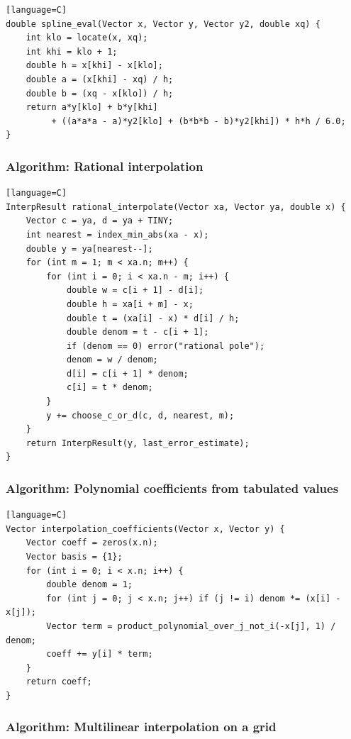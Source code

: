 \documentclass[11pt]{article}
\begin{document}
\begin{verbatim}[language=C]
double spline_eval(Vector x, Vector y, Vector y2, double xq) {
    int klo = locate(x, xq);
    int khi = klo + 1;
    double h = x[khi] - x[klo];
    double a = (x[khi] - xq) / h;
    double b = (xq - x[klo]) / h;
    return a*y[klo] + b*y[khi]
         + ((a*a*a - a)*y2[klo] + (b*b*b - b)*y2[khi]) * h*h / 6.0;
}
\end{verbatim}

\subsubsection{Algorithm: Rational interpolation}\label{algorithm-rational-interpolation}

\begin{verbatim}[language=C]
InterpResult rational_interpolate(Vector xa, Vector ya, double x) {
    Vector c = ya, d = ya + TINY;
    int nearest = index_min_abs(xa - x);
    double y = ya[nearest--];
    for (int m = 1; m < xa.n; m++) {
        for (int i = 0; i < xa.n - m; i++) {
            double w = c[i + 1] - d[i];
            double h = xa[i + m] - x;
            double t = (xa[i] - x) * d[i] / h;
            double denom = t - c[i + 1];
            if (denom == 0) error("rational pole");
            denom = w / denom;
            d[i] = c[i + 1] * denom;
            c[i] = t * denom;
        }
        y += choose_c_or_d(c, d, nearest, m);
    }
    return InterpResult(y, last_error_estimate);
}
\end{verbatim}

\subsubsection{Algorithm: Polynomial coefficients from tabulated values}\label{algorithm-polynomial-coefficients-from-tabulated-values}

\begin{verbatim}[language=C]
Vector interpolation_coefficients(Vector x, Vector y) {
    Vector coeff = zeros(x.n);
    Vector basis = {1};
    for (int i = 0; i < x.n; i++) {
        double denom = 1;
        for (int j = 0; j < x.n; j++) if (j != i) denom *= (x[i] - x[j]);
        Vector term = product_polynomial_over_j_not_i(-x[j], 1) / denom;
        coeff += y[i] * term;
    }
    return coeff;
}
\end{verbatim}

\subsubsection{Algorithm: Multilinear interpolation on a grid}\label{algorithm-multilinear-interpolation-on-a-grid}
\end{document}
